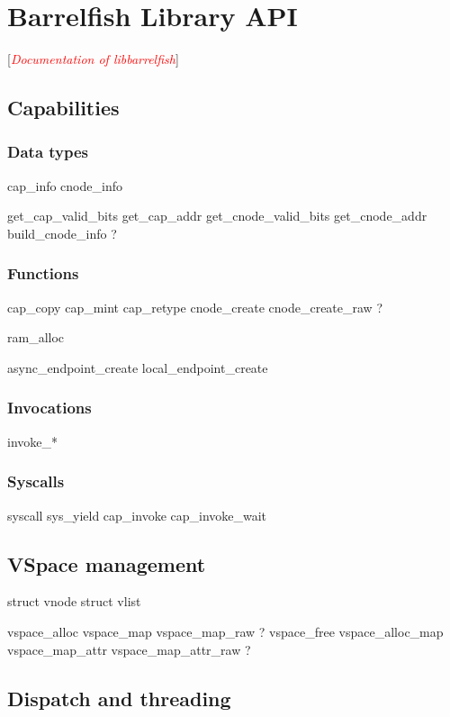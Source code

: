 \documentclass[a4paper,11pt,twoside]{report}
\newcommand{\todo}[1]{[\textcolor{red}{\emph{#1}}]}
\begin{document}
\chapter{Barrelfish Library API}
\todo{Documentation of libbarrelfish}

\section{Capabilities}

\subsection{Data types}

cap\_info
cnode\_info

get\_cap\_valid\_bits
get\_cap\_addr
get\_cnode\_valid\_bits
get\_cnode\_addr
build\_cnode\_info ?

\subsection{Functions}

cap\_copy
cap\_mint
cap\_retype
cnode\_create
cnode\_create\_raw ?

ram\_alloc

async\_endpoint\_create
local\_endpoint\_create

\subsection{Invocations}
invoke\_*

\subsection{Syscalls}

syscall
sys\_yield
cap\_invoke
cap\_invoke\_wait


\section{VSpace management}

struct vnode
struct vlist

vspace\_alloc
vspace\_map
vspace\_map\_raw ?
vspace\_free
vspace\_alloc\_map
vspace\_map\_attr
vspace\_map\_attr\_raw ?

\section{Dispatch and threading}
\end{document}
